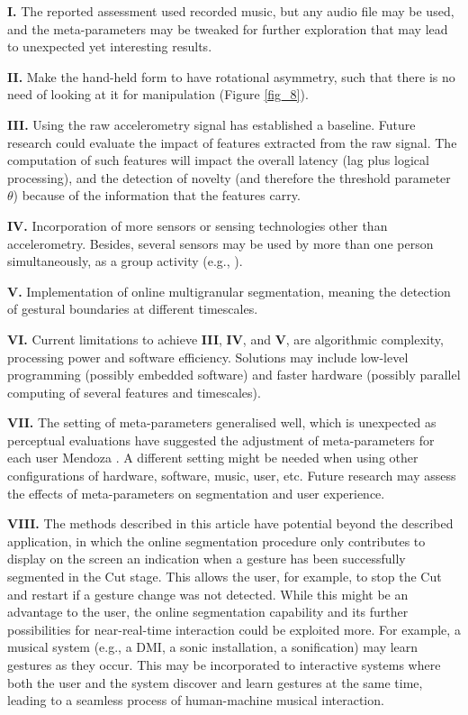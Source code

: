 \documentclass{nime-alternate_ADJ} %
\begin{document}
\textbf{I.} The reported assessment used recorded music, but any audio file may be used, and the meta-parameters may be tweaked for further exploration that may lead to unexpected yet interesting results.

\textbf{II.} Make the hand-held form to have rotational asymmetry, such that there is no need of looking at it for manipulation (Figure \ref{fig_8}).

\textbf{III.}  Using the raw accelerometry signal has established a baseline. Future research could evaluate the impact of features extracted from the raw signal. The computation of such features will impact the overall latency (lag plus logical processing), and the detection of novelty (and therefore the threshold parameter $\theta $) because of the information that the features carry. 

\textbf{IV.}  Incorporation of more sensors or sensing technologies other than accelerometry. Besides, several sensors may be used by more than one person simultaneously, as a group activity (e.g., \cite{Staudt_etal_2022, Tahiroglu_etal_2013}). 

\textbf{V.} Implementation of online multigranular segmentation, meaning the detection of gestural boundaries at different timescales.

\textbf{VI.} Current limitations to achieve \textbf{III}, \textbf{IV}, and \textbf{V}, are algorithmic complexity, processing power and software efficiency. Solutions may include low-level programming (possibly embedded software) and faster hardware (possibly parallel computing of several features and timescales).

\textbf{VII.} The setting of meta-parameters generalised well, which is unexpected as perceptual evaluations have suggested the adjustment of meta-parameters for each user 
Mendoza \cite{Mendoza_2022}. 
A different setting might be needed when using other configurations of hardware, software, music, user, etc. Future research may assess the effects of meta-parameters on segmentation and user experience.

\textbf{VIII.} The methods described in this article have potential beyond the described application, in which the online segmentation procedure only contributes to display on the screen an indication when a gesture has been successfully segmented in the Cut stage. This allows the user, for example, to stop the Cut and restart if a gesture change was not detected. While this might be an advantage to the user, the online segmentation capability and its further possibilities for near-real-time interaction could be exploited more. For example, a musical system (e.g., a DMI, a sonic installation, a sonification) may learn gestures as they occur. This may be incorporated to interactive systems where both the user and the system discover and learn gestures at the same time, leading to a seamless process of human-machine musical interaction.
\end{document}
